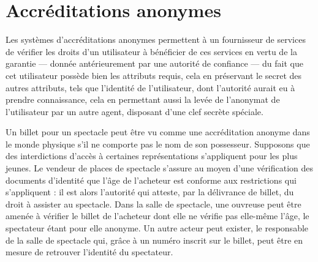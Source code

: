 
\section{Accréditations anonymes} %

Les systèmes d’accréditations anonymes permettent à un fournisseur de services de vérifier les droits d’un utilisateur à bénéficier de ces services en vertu de la garantie --- donnée antérieurement par une autorité de confiance --- du fait que cet utilisateur possède bien les attributs requis, cela en préservant le secret des autres attributs, tels que l’identité de l’utilisateur, dont l’autorité aurait eu à prendre connaissance, cela en permettant aussi la levée de l’anonymat de l’utilisateur par un autre agent, disposant d’une clef secrète spéciale.

Un billet pour un spectacle peut être vu comme une accréditation anonyme dans le monde physique s’il ne
comporte pas le nom de son possesseur.
Supposons que des interdictions d’accès à certaines représentations s’appliquent pour les plus
jeunes.
Le vendeur de places de spectacle s’assure au moyen d’une vérification des documents d’identité que
l’âge de l’acheteur est conforme aux restrictions qui s’appliquent : il est alors l’autorité qui
atteste, par la délivrance de billet, du droit à assister au spectacle.
Dans la salle de spectacle, une ouvreuse peut être amenée à vérifier le billet de l’acheteur dont
elle ne vérifie pas elle-même l’âge, le spectateur étant pour elle anonyme.
Un autre acteur peut exister, le responsable de la salle de spectacle qui, grâce à un numéro inscrit
sur le billet, peut être en mesure de retrouver l’identité du spectateur.

